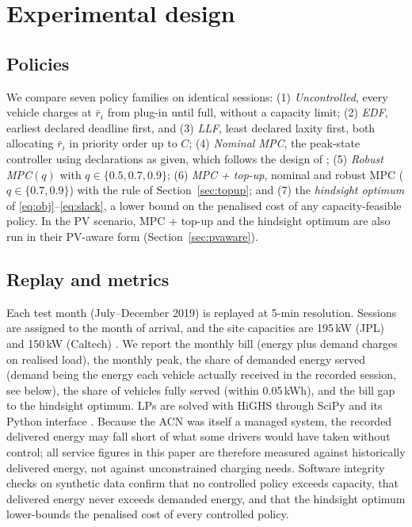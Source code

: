 \section{Experimental design}\label{sec:design}
\subsection{Policies}
We compare seven policy families on identical sessions: (1) \emph{Uncontrolled}, every vehicle charges at $\bar r_i$ from plug-in until full, without a capacity limit; (2) \emph{EDF}, earliest declared deadline first, and (3) \emph{LLF}, least declared laxity first, both allocating $\bar r_i$ in priority order up to $C$; (4) \emph{Nominal MPC}, the peak-state controller using declarations as given, which follows the design of \cite{Lee2020Pricing}; (5) \emph{Robust MPC}$(q)$ with $q\in\{0.5,0.7,0.9\}$; (6) \emph{MPC + top-up}, nominal and robust MPC ($q\in\{0.7,0.9\}$) with the rule of Section~\ref{sec:topup}; and (7) the \emph{hindsight optimum} of \eqref{eq:obj}--\eqref{eq:slack}, a lower bound on the penalised cost of any capacity-feasible policy. In the PV scenario, MPC + top-up and the hindsight optimum are also run in their PV-aware form (Section~\ref{sec:pvaware}).

\subsection{Replay and metrics}
Each test month (July--December 2019) is replayed at 5-min resolution. Sessions are assigned to the month of arrival, and the site capacities are 195\,kW (JPL) and 150\,kW (Caltech) \cite{Lee2019ACNData}. We report the monthly bill (energy plus demand charges on realised load), the monthly peak, the share of demanded energy served (demand being the energy each vehicle actually received in the recorded session, see below), the share of vehicles fully served (within 0.05\,kWh), and the bill gap to the hindsight optimum. LPs are solved with HiGHS \cite{Huangfu2018HiGHS} through SciPy and its Python interface \cite{Virtanen2020SciPy}. Because the ACN was itself a managed system, the recorded delivered energy may fall short of what some drivers would have taken without control; all service figures in this paper are therefore measured against historically delivered energy, not against unconstrained charging needs. Software integrity checks on synthetic data confirm that no controlled policy exceeds capacity, that delivered energy never exceeds demanded energy, and that the hindsight optimum lower-bounds the penalised cost of every controlled policy.

